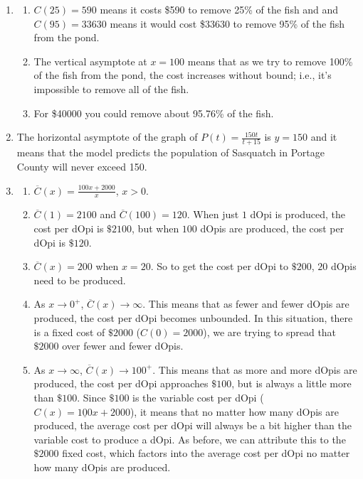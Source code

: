 \begin{enumerate}
\setcounter{enumi}{\value{HW}}

\item \begin{enumerate}

\item $C(25) = 590$ means it costs \$590 to remove 25\% of the fish and and $C(95)= 33630$ means it would cost \$33630 to remove 95\% of the fish from the pond.
\item The vertical asymptote at $x = 100$ means that as we try to remove 100\% of the fish from the pond, the cost increases without bound; i.e., it's impossible to remove all of the fish.  
\item For \$40000 you could remove about 95.76\% of the fish.

\end{enumerate}


\item The horizontal asymptote of the graph of $P(t) = \frac{150t}{t + 15}$ is $y = 150$ and it means that the model predicts the population of Sasquatch in Portage County will never exceed 150.

\item  \begin{enumerate}

\item $\overline{C}(x) = \frac{100x+2000}{x}$, $x > 0$.

\item  $\overline{C}(1) = 2100$ and $\overline{C}(100) = 120$. When just $1$ dOpi is produced, the cost per dOpi is $\$2100$, but when $100$ dOpis are produced, the cost per dOpi is $\$120$.  

\item  $\overline{C}(x) = 200$ when $x = 20$.  So to get the cost per dOpi to $\$200$, $20$ dOpis need to be produced.

\item  As $x \rightarrow 0^{+}$, $\overline{C}(x) \rightarrow \infty$.  This means that as fewer and fewer dOpis are produced, the cost per dOpi becomes unbounded.  In this situation, there is a fixed cost of $\$2000$ ($C(0) = 2000$), we are trying to spread that $\$2000$ over fewer and fewer dOpis.

\item   As $x \rightarrow \infty$,  $\overline{C}(x) \rightarrow 100^{+}$.  This means that as more and more dOpis are produced, the cost per dOpi approaches $\$100$, but is always a little more than $\$100$.  Since $\$100$ is the variable cost per dOpi ($C(x) = \underline{100}x+2000$), it means that no matter how many dOpis are produced, the average cost per dOpi will always be a bit higher than the variable cost to produce a dOpi.  As before, we can attribute this to the $\$2000$ fixed cost, which factors into the average cost per dOpi no matter how many dOpis are produced.



\end{enumerate}
\end{enumerate}
